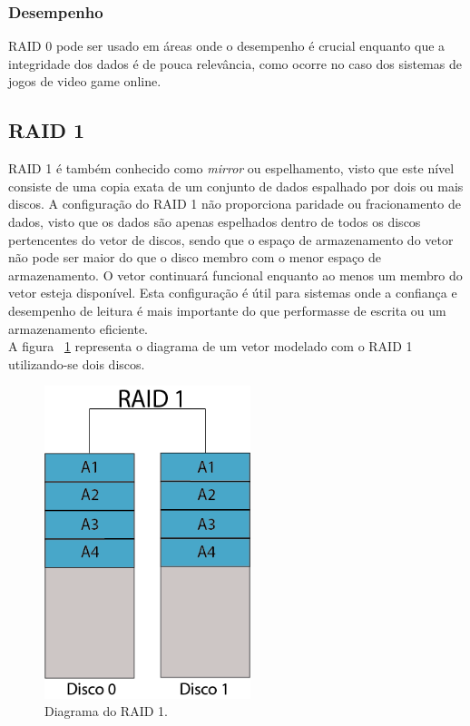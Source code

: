 		\subsubsection{Desempenho}
		
		RAID 0 pode ser usado em áreas onde o desempenho é crucial enquanto que a integridade dos dados é de pouca relevância, como ocorre no caso dos sistemas de jogos de video game online.\\
		
		\subsection{RAID 1}
		
		RAID 1 é também conhecido como \textit{mirror} ou espelhamento, visto que este nível consiste de uma copia exata de um conjunto de dados espalhado por dois ou mais discos. A configuração do RAID 1 não proporciona paridade ou fracionamento de dados, visto que os dados são apenas espelhados dentro de todos os discos pertencentes do vetor de discos, sendo que o espaço de armazenamento do vetor não pode ser maior do que o disco membro com o menor espaço de armazenamento. O vetor continuará funcional enquanto ao menos um membro do vetor esteja disponível. Esta configuração é útil para sistemas onde a confiança e desempenho de leitura é mais importante do que performasse de escrita ou um armazenamento eficiente. \\
		
		A figura ~\ref{fig:raid1} representa o diagrama de um vetor modelado com o RAID 1 utilizando-se dois discos.\\
		
		\begin{figure}[htb]
			\begin{center}
				
				\includegraphics[clip,width=6.0cm]{images/RAID_1.png}
				\caption{Diagrama do RAID 1. }
				\label{fig:raid1}
			\end{center}
		\end{figure} 
		
